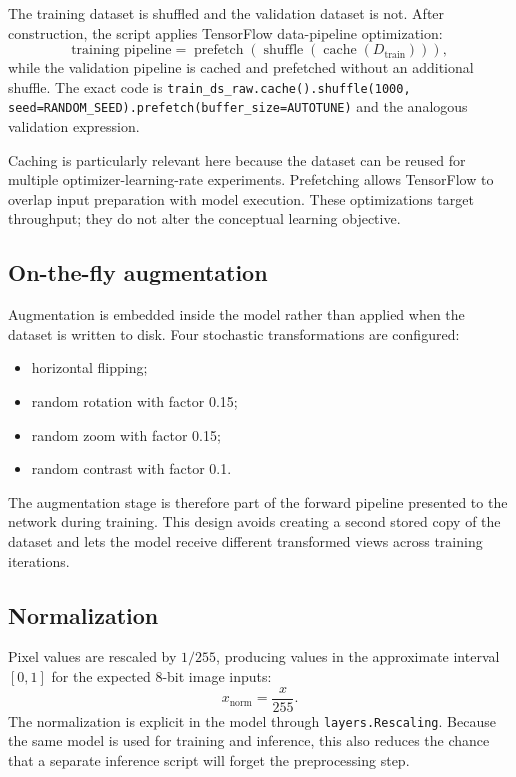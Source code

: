 \documentclass[11pt,a4paper]{article}
\newcommand{\code}[1]{\texttt{#1}}
\begin{document}
The training dataset is shuffled and the validation dataset is not. After construction, the script applies TensorFlow data-pipeline optimization:
\begin{equation}
\text{training pipeline}
=
\operatorname{prefetch}\!\left(\operatorname{shuffle}\!\left(\operatorname{cache}(D_{\mathrm{train}})\right)\right),
\end{equation}
while the validation pipeline is cached and prefetched without an additional shuffle. The exact code is \code{train\_ds\_raw.cache().shuffle(1000, seed=RANDOM\_SEED).prefetch(buffer\_size=AUTOTUNE)} and the analogous validation expression.

Caching is particularly relevant here because the dataset can be reused for multiple optimizer-learning-rate experiments. Prefetching allows TensorFlow to overlap input preparation with model execution. These optimizations target throughput; they do not alter the conceptual learning objective.

\subsection{On-the-fly augmentation}
Augmentation is embedded inside the model rather than applied when the dataset is written to disk. Four stochastic transformations are configured:
\begin{itemize}[leftmargin=1.7em]
\item horizontal flipping;
\item random rotation with factor 0.15;
\item random zoom with factor 0.15;
\item random contrast with factor 0.1.
\end{itemize}
The augmentation stage is therefore part of the forward pipeline presented to the network during training. This design avoids creating a second stored copy of the dataset and lets the model receive different transformed views across training iterations.

\subsection{Normalization}
Pixel values are rescaled by $1/255$, producing values in the approximate interval $[0,1]$ for the expected 8-bit image inputs:
\begin{equation}
x_{\mathrm{norm}}=\frac{x}{255}.
\end{equation}
The normalization is explicit in the model through \code{layers.Rescaling}. Because the same model is used for training and inference, this also reduces the chance that a separate inference script will forget the preprocessing step.
\end{document}
